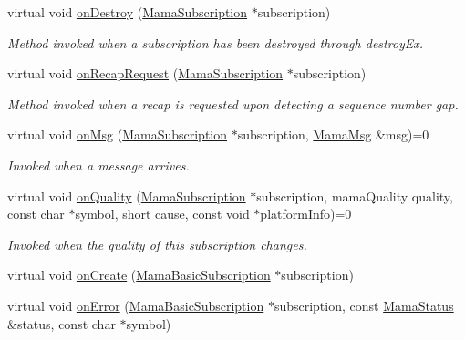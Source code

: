 \begin{DoxyCompactItemize}
virtual void \hyperlink{classWombat_1_1MamaSubscriptionCallback_a6405ac3d7129e737429d129dfd90a510}{onDestroy} (\hyperlink{classWombat_1_1MamaSubscription}{MamaSubscription} $\ast$subscription)
\begin{DoxyCompactList}\small\item\em Method invoked when a subscription has been destroyed through destroyEx. \item\end{DoxyCompactList}\item 
virtual void \hyperlink{classWombat_1_1MamaSubscriptionCallback_a78cb77e1859e1b7b56dcfad135000fe3}{onRecapRequest} (\hyperlink{classWombat_1_1MamaSubscription}{MamaSubscription} $\ast$subscription)
\begin{DoxyCompactList}\small\item\em Method invoked when a recap is requested upon detecting a sequence number gap. \item\end{DoxyCompactList}\item 
virtual void \hyperlink{classWombat_1_1MamaSubscriptionCallback_ab269bb4f32930dc167b7e0f0f3b188a2}{onMsg} (\hyperlink{classWombat_1_1MamaSubscription}{MamaSubscription} $\ast$subscription, \hyperlink{classWombat_1_1MamaMsg}{MamaMsg} \&msg)=0
\begin{DoxyCompactList}\small\item\em Invoked when a message arrives. \item\end{DoxyCompactList}\item 
virtual void \hyperlink{classWombat_1_1MamaSubscriptionCallback_a3883b459581434f2d171fd9938eb5d57}{onQuality} (\hyperlink{classWombat_1_1MamaSubscription}{MamaSubscription} $\ast$subscription, mamaQuality quality, const char $\ast$symbol, short cause, const void $\ast$platformInfo)=0
\begin{DoxyCompactList}\small\item\em Invoked when the quality of this subscription changes. \item\end{DoxyCompactList}\item 
virtual void \hyperlink{classWombat_1_1MamaSubscriptionCallback_a43dfe37a97f29c7f0e4a98ea119d8cd8}{onCreate} (\hyperlink{classWombat_1_1MamaBasicSubscription}{MamaBasicSubscription} $\ast$subscription)
\item 
virtual void \hyperlink{classWombat_1_1MamaSubscriptionCallback_ac1fe8bc531ec11df516ef56781d6b10d}{onError} (\hyperlink{classWombat_1_1MamaBasicSubscription}{MamaBasicSubscription} $\ast$subscription, const \hyperlink{classWombat_1_1MamaStatus}{MamaStatus} \&status, const char $\ast$symbol)

\end{DoxyCompactItemize}
